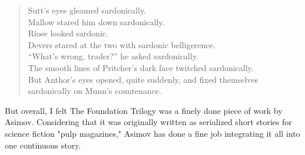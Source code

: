 \documentclass[12pt, a4paper]{article}
\begin{document}
\begin{verse}
Sutt's eyes gleamed sardonically.\\
Mallow stared him down sardonically.\\
Riose looked sardonic.\\
Devers stared at the two with sardonic belligerence.\\
``What's wrong, trader?'' he asked sardonically.\\
The smooth lines of Pritcher's dark face twitched sardonically.\\
But Anthor's eyes opened, quite suddenly, and fixed themselves
sardonically on Munn's countenance.
\end{verse}

  But overall, I felt The Foundation Trilogy was a finely done piece of work by
Asimov.  Considering that it was originally written as serialized short stories
for science fiction "pulp magazines," Asimov has done a fine job integrating it
all into one continuous story.
\end{document}
